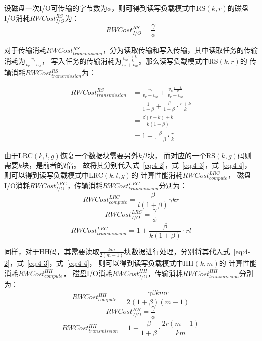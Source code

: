 设磁盘一次I/O可传输的字节数为$\phi$，则可得到读写负载模式中RS$(k,r)$的磁盘I/O消耗$RWCost_{I/O}^{RS}$为：
\begin{equation}
	\label{eq:4-3}
	RWCost_{I/O}^{RS} = \frac{\gamma}{\phi}
\end{equation}

对于传输消耗$RWCost_{transmission}^{RS}$，分为读取传输和写入传输，其中读取任务的传输消耗为$\frac{v_r}{v_r+v_w}$，
写入任务的传输消耗为$\frac{v_w\frac{r+k}{k}}{v_r+v_w}$。那么读写负载模式中RS$(k,r)$的
传输消耗$RWCost_{transmission}^{RS}$为：

\begin{equation}
	\begin{aligned}
	\label{eq:4-4}
	RWCost_{transmission}^{RS} & = \frac{v_r}{v_r+v_w} + \frac{v_w\frac{r+k}{k}}{v_r+v_w} \\
	                    & = \frac{1}{1+\beta} + \frac{\beta}{1+\beta} \cdot \frac{r+k}{k} \\
						& = \frac{\beta(r+k)+k}{k(1 + \beta)} \\
						& = 1 + \frac{\beta}{1 + \beta} \cdot \frac{r}{k}
	\end{aligned}
\end{equation}

由于LRC$(k,l,g)$恢复一个数据块需要另外$k/l$块，
而对应的一个RS$(k,g)$码则需要$k$块，是前者的$l$倍。
故将其分别代入式~\ref{eq:4-2}，式~\ref{eq:4-3}，式~\ref{eq:4-4}，则可以得到读写负载模式中LRC$(k,l,g)$的
计算性能消耗$RWCost_{compute}^{LRC}$，
磁盘I/O消耗$RWCost_{I/O}^{LRC}$，传输消耗$RWCost_{transmission}^{LRC}$分别为：
\begin{equation}
	\label{eq:4-5}
	RWCost_{compute}^{LRC} = \frac{\beta}{l(1+\beta)} \gamma kr
\end{equation}
\begin{equation}
	\label{eq:4-6}
	RWCost_{I/O}^{LRC} = \frac{\gamma}{\phi}
\end{equation}
\begin{equation}
	\label{eq:4-7}
	RWCost_{transmission}^{LRC} = 1 + \frac{\beta}{k(1 + \beta)} \cdot rl
\end{equation}

同样，对于HH码，其需要读取$\frac{km}{2(m-1)}$块数据进行处理，分别将其代入式~\ref{eq:4-2}，式~\ref{eq:4-3}，式~\ref{eq:4-4}，
则可以得到读写负载模式中HH$(k,m)$的
计算性能消耗$RWCost_{compute}^{HH}$，
磁盘I/O消耗$RWCost_{I/O}^{HH}$，传输消耗$RWCost_{transmission}^{HH}$分别为：
\begin{equation}
	\label{eq:4-8}
	RWCost_{compute}^{HH} = \frac{\gamma \beta kmr}{2(1+\beta)(m-1)}
\end{equation}
\begin{equation}
	\label{eq:4-9}
	RWCost_{I/O}^{HH} = \frac{\gamma}{\phi}
\end{equation}
\begin{equation}
	\label{eq:4-10}
	RWCost_{transmission}^{HH} = 1 + \frac{\beta}{1 + \beta} \cdot \frac{2r(m-1)}{km}
\end{equation}


